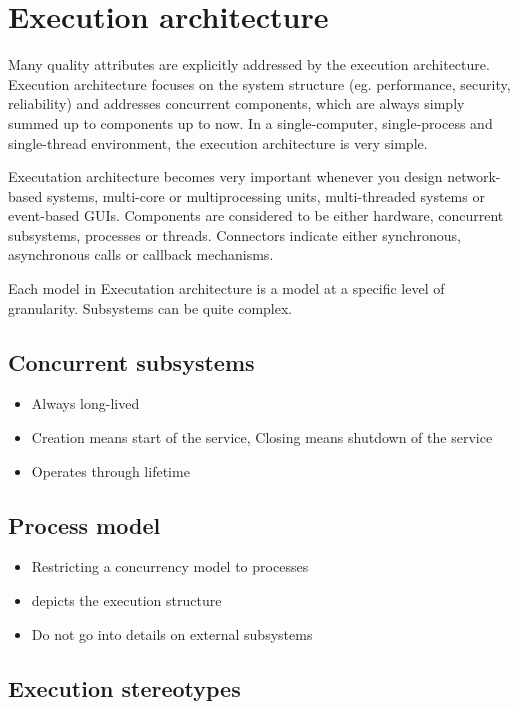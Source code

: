 \documentclass[a4paper]{report}
\begin{document}
\chapter{Execution architecture}

Many quality attributes are explicitly addressed by the execution
architecture. Execution architecture focuses on the system structure
(eg. performance, security, reliability) and addresses concurrent
components, which are always simply summed up to components up to now.
In a single-computer, single-process and single-thread environment, the
execution architecture is very simple.

Executation architecture becomes very important whenever you design
network-based systems, multi-core or multiprocessing units, multi-threaded
systems or event-based GUIs. Components are considered to be either
hardware, concurrent subsystems, processes or threads. Connectors indicate
either synchronous, asynchronous calls or callback mechanisms.

Each model in Executation architecture is a model at a specific level of
granularity. Subsystems can be quite complex.

\section{Concurrent subsystems}

\begin{itemize}
  \item Always long-lived
  \item Creation means start of the service,
        Closing means shutdown of the service
  \item Operates through lifetime
\end{itemize}

\section{Process model}

\begin{itemize}
  \item Restricting a concurrency model to processes
  \item depicts the execution structure
  \item Do not go into details on external subsystems
\end{itemize}

\section{Execution stereotypes}
\end{document}
